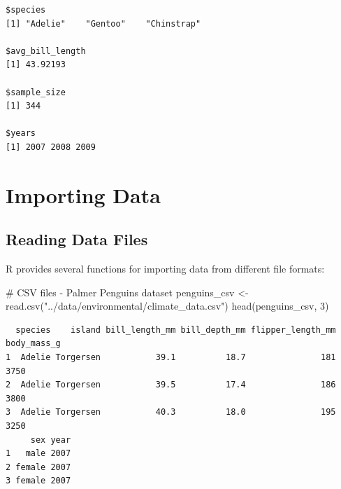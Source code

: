 \documentclass[
  letterpaper,
]{book}
\newenvironment{Shaded}{\begin{snugshade}}{\end{snugshade}}
\newcommand{\AttributeTok}[1]{\textcolor[rgb]{0.40,0.45,0.13}{#1}}
\newcommand{\CommentTok}[1]{\textcolor[rgb]{0.37,0.37,0.37}{#1}}
\newcommand{\ConstantTok}[1]{\textcolor[rgb]{0.56,0.35,0.01}{#1}}
\newcommand{\DecValTok}[1]{\textcolor[rgb]{0.68,0.00,0.00}{#1}}
\newcommand{\FunctionTok}[1]{\textcolor[rgb]{0.28,0.35,0.67}{#1}}
\newcommand{\NormalTok}[1]{\textcolor[rgb]{0.00,0.23,0.31}{#1}}
\newcommand{\OtherTok}[1]{\textcolor[rgb]{0.00,0.23,0.31}{#1}}
\newcommand{\SpecialCharTok}[1]{\textcolor[rgb]{0.37,0.37,0.37}{#1}}
\newcommand{\StringTok}[1]{\textcolor[rgb]{0.13,0.47,0.30}{#1}}
\begin{document}
\begin{Shaded}
\end{Shaded}

\begin{verbatim}
$species
[1] "Adelie"    "Gentoo"    "Chinstrap"

$avg_bill_length
[1] 43.92193

$sample_size
[1] 344

$years
[1] 2007 2008 2009
\end{verbatim}

\section{Importing Data}\label{importing-data}

\subsection{Reading Data Files}\label{reading-data-files}

R provides several functions for importing data from different file
formats:

\begin{Shaded}
\begin{Highlighting}[]
\CommentTok{\# CSV files {-} Palmer Penguins dataset}
\NormalTok{penguins\_csv }\OtherTok{\textless{}{-}} \FunctionTok{read.csv}\NormalTok{(}\StringTok{"../data/environmental/climate\_data.csv"}\NormalTok{)}
\FunctionTok{head}\NormalTok{(penguins\_csv, }\DecValTok{3}\NormalTok{)}
\end{Highlighting}
\end{Shaded}

\begin{verbatim}
  species    island bill_length_mm bill_depth_mm flipper_length_mm body_mass_g
1  Adelie Torgersen           39.1          18.7               181        3750
2  Adelie Torgersen           39.5          17.4               186        3800
3  Adelie Torgersen           40.3          18.0               195        3250
     sex year
1   male 2007
2 female 2007
3 female 2007
\end{verbatim}
\end{document}
